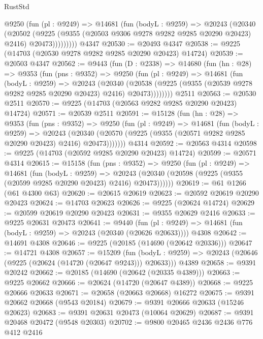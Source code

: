 \begin{lexlean}{RustStd}
\begin{coremodule}
          @9250
            (fun (pl : @9249) =>
            @14681
              (fun (bodyL : @9259) =>
              @20243
                (@20340
                  (@20502
                    (@9225
                      (@9355 (@20503 @9306 @9278 @9282 @9285 @20290 @20423) @2416)
                      @20473)))))))))
    @4347
@20530 := @20493 @4347
@20538 := @9225 (@14703 (@20530 @9278 @9282 @9285 @20290 @20423) @14724)
@20539 := @20503 @4347
@20562 := @9443
    (fun (D : @2338) =>
    @14680
      (fun (hn : @28) =>
      @9353
        (fun (pns : @9352) =>
        @9250
          (fun (pl : @9249) =>
          @14681
            (fun (bodyL : @9259) =>
            @20243
              (@20340
                (@20538 (@9225 (@9355 (@20539 @9278 @9282 @9285 @20290 @20423) @2416) @20473))))))))
    @2511
@20563 := @20530 @2511
@20570 := @9225 (@14703 (@20563 @9282 @9285 @20290 @20423) @14724)
@20571 := @20539 @2511
@20591 := @15128
    (fun (hn : @28) =>
    @9353
      (fun (pns : @9352) =>
      @9250
        (fun (pl : @9249) =>
        @14681
          (fun (bodyL : @9259) =>
          @20243
            (@20340 (@20570 (@9225 (@9355 (@20571 @9282 @9285 @20290 @20423) @2416) @20473)))))))
    @4314
@20592 := @20563 @4314
@20598 := @9225 (@14703 (@20592 @9285 @20290 @20423) @14724)
@20599 := @20571 @4314
@20615 := @15158
    (fun (pns : @9352) =>
    @9250
      (fun (pl : @9249) =>
      @14681
        (fun (bodyL : @9259) =>
        @20243 (@20340 (@20598 (@9225 (@9355 (@20599 @9285 @20290 @20423) @2416) @20473))))))
@20619 := @61 @1266 (@61 @4300 @63)
@20620 := @20615 @20619
@20623 := @20592 @20619 @20290 @20423
@20624 := @14703 @20623
@20626 := @9225 (@20624 @14724)
@20629 := @20599 @20619 @20290 @20423
@20631 := @9355 @20629 @2416
@20633 := @9225 @20631 @20473
@20641 := @9440
    (fun (pl : @9249) => @14681 (fun (bodyL : @9259) => @20243 (@20340 (@20626 @20633))))
    @4308
@20642 := @14691 @4308
@20646 := @9225 (@20185 (@14690 (@20642 @20336)))
@20647 := @14721 @4308
@20657 := @15209
    (fun (bodyL : @9259) => @20243 (@20646 (@9225 (@20624 (@14720 (@20647 @9243))) @20633)))
    @4389
@20658 := @9391 @20242
@20662 := @20185 (@14690 (@20642 (@20335 @4389)))
@20663 := @9225 @20662
@20666 := @20624 (@14720 (@20647 @4389))
@20668 := @9225 @20666 @20633
@20671 := @20658 (@20663 @20668) @16272
@20675 := @9391 @20662 @20668 (@9543 @20184)
@20679 := @9391 @20666 @20633 (@15246 @20623)
@20683 := @9391 @20631 @20473 (@10064 @20629)
@20687 := @9391 @20468 @20472 (@9548 @20303)
@20702 := @9800
    @20465
    @2436
    @2436
    @776
    @412
    @2416

\end{coremodule}
\end{lexlean}
